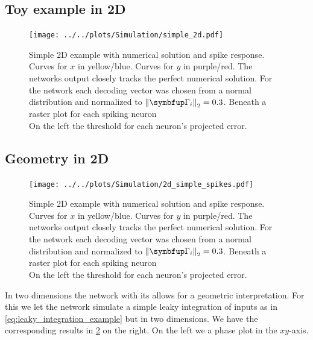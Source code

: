 \subsection{Toy example in 2D}

\begin{figure}[h!]
	\centering
	\texttt{[image: ../../plots/Simulation/simple\_2d.pdf]}
	\caption{Simple 2D example with numerical solution and spike response. Curves for $x$ in yellow/blue. Curves for $y$ in purple/red. The networks output closely tracks the perfect numerical solution. For the network each decoding vector was chosen from a normal distribution and normalized to $\left\lVert\bmu{\Gamma}_i\right\rVert_2 =0.3$. Beneath a raster plot for each spiking neuron \\ On the left the threshold for each neuron's projected error.}
	\label{fig:sim_res_simple}
\end{figure}



\subsection{Geometry in 2D}
\begin{figure}[h!]
	\centering
	\texttt{[image: ../../plots/Simulation/2d\_simple\_spikes.pdf]}
	\caption{Simple 2D example with numerical solution and spike response. Curves for $x$ in yellow/blue. Curves for $y$ in purple/red. The networks output closely tracks the perfect numerical solution. For the network each decoding vector was chosen from a normal distribution and normalized to $\left\lVert\bmu{\Gamma}_i\right\rVert_2 =0.3$. Beneath a raster plot for each spiking neuron \\ On the left the threshold for each neuron's projected error.}
	\label{fig:sim_res_geometric}
\end{figure}
In two dimensions the network with its allows for a geometric interpretation. For this we let the network simulate a simple leaky integration of inputs as in \cref{eq:leaky_integration_example} but in two dimensions. We have the corresponding results in \cref{fig:sim_res_geometric} on the right. On the left we a phase plot in the $xy$-axis.


